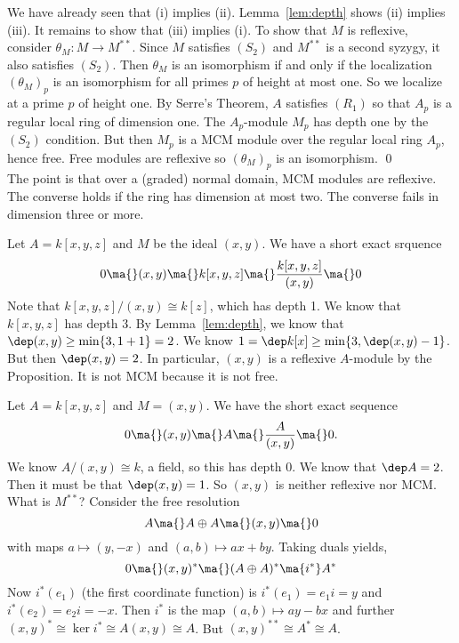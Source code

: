 \pf We have already seen that (i) implies (ii). Lemma~\ref{lem:depth} shows (ii) implies (iii). It remains to show that (iii) implies (i). To show that $M$ is reflexive, consider $\theta_M: M \to M^{**}$. Since $M$ satisfies $(S_2)$ and $M^{**}$ is a second syzygy, it also satisfies $(S_2)$. Then $\theta_M$ is an isomorphism if and only if the localization $(\theta_M)_p$ is an isomorphism for all primes $p$ of height at most one. So we localize at a prime $p$ of height one. By Serre's Theorem, $A$ satisfies $(R_1)$ so that $A_p$ is a regular local ring of dimension one. The $A_p$-module $M_p$ has depth one by the $(S_2)$ condition. But then $M_p$ is a MCM module over the regular local ring $A_p$, hence free. Free modules are reflexive so $(\theta_M)_p$ is an isomorphism. \qed \\


The point is that over a (graded) normal domain, MCM modules are reflexive. The converse holds if the ring has dimension at most two. The converse fails in dimension three or more. 


\begin{ex}
Let $A= k[x,y,z]$ and $M$ be the ideal $(x,y)$. We have a short exact srquence
	\[
	0 \ma{} (x,y) \ma{} k[x,y,z] \ma{} \dfrac{k[x,y,z]}{(x,y)} \ma{} 0
	\]
Note that $k[x,y,z]/(x,y) \cong k[z]$, which has depth 1. We know that $k[x,y,z]$ has depth 3. By Lemma~\ref{lem:depth}, we know that $\dep (x,y) \geq \min\{3,1+1\} =2$. We know $1= \dep k[x] \geq \min\{3,\dep(x,y)-1\}$. But then $\dep (x,y)=2$. In particular, $(x,y)$ is a reflexive $A$-module by the Proposition. It is not MCM because it is not free. 
\end{ex}


\begin{ex}
Let $A= k[x,y,z]$ and $M= (x,y)$. We have the short exact sequence
	\[
	0 \ma{} (x,y) \ma{} A \ma{} \dfrac{A}{(x,y)} \ma{} 0.
	\]
We know $A/(x,y) \cong k$, a field, so this has depth 0. We know that $\dep A=2$. Then it must be that $\dep (x,y)=1$. So $(x,y)$ is neither reflexive nor MCM. What is $M^{**}$? Consider the free resolution
	\[
	A \ma{} A \oplus A \ma{} (x,y) \ma{} 0
	\]
with maps $a \mapsto (y,-x)$ and $(a,b) \mapsto ax+by$. Taking duals yields,
	\[
	0 \ma{} (x,y)^* \ma{} (A \oplus A)^* \ma{i^*} A^*
	\]
Now $i^*(e_1)$ (the first coordinate function) is $i^*(e_1)=e_1i=y$ and $i^*(e_2)=e_2i= -x$. Then $i^*$ is the map $(a,b) \mapsto ay-bx$ and further $(x,y)^* \cong \ker i^* \cong A(x,y) \cong A$. But $(x,y)^{**} \cong A^* \cong A$. 

\end{ex}


